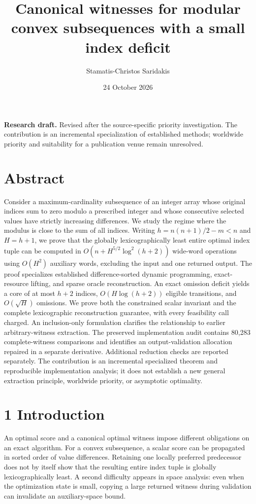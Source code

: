 \documentclass[
  11pt,
  letterpaper,
]{article}
\title{Canonical witnesses for modular convex subsequences with a small
index deficit}
\author{Stamatis-Christos Saridakis}
\date{24 October 2026}
\begin{document}
\maketitle

\textbf{Research draft.} Revised after the source-specific priority
investigation. The contribution is an incremental specialization of
established methods; worldwide priority and suitability for a
publication venue remain unresolved.

\hypertarget{abstract}{%
\section{Abstract}\label{abstract}}

Consider a maximum-cardinality subsequence of an integer array whose
original indices sum to zero modulo a prescribed integer and whose
consecutive selected values have strictly increasing differences. We
study the regime where the modulus is close to the sum of all indices.
Writing \(h=n(n+1)/2-m<n\) and \(H=h+1\), we prove that the globally
lexicographically least entire optimal index tuple can be computed in
\(O(n+H^{5/2}\log^2(h+2))\) wide-word operations using \(O(H^2)\)
auxiliary words, excluding the input and one returned output. The proof
specializes established difference-sorted dynamic programming,
exact-resource lifting, and sparse oracle reconstruction. An exact
omission deficit yields a core of at most \(h+2\) indices,
\(O(H\log(h+2))\) eligible transitions, and \(O(\sqrt H)\) omissions. We
prove both the constrained scalar invariant and the complete
lexicographic reconstruction guarantee, with every feasibility call
charged. An inclusion-only formulation clarifies the relationship to
earlier arbitrary-witness extraction. The preserved implementation audit
contains 80,283 complete-witness comparisons and identifies an
output-validation allocation repaired in a separate derivative.
Additional reduction checks are reported separately. The contribution is
an incremental specialized theorem and reproducible implementation
analysis; it does not establish a new general extraction principle,
worldwide priority, or asymptotic optimality.

\hypertarget{introduction}{%
\section{1 Introduction}\label{introduction}}

An optimal score and a canonical optimal witness impose different
obligations on an exact algorithm. For a convex subsequence, a scalar
score can be propagated in sorted order of value differences. Retaining
one locally preferred predecessor does not by itself show that the
resulting entire index tuple is globally lexicographically least. A
second difficulty appears in space analysis: even when the optimization
state is small, copying a large returned witness during validation can
invalidate an auxiliary-space bound.
\end{document}
